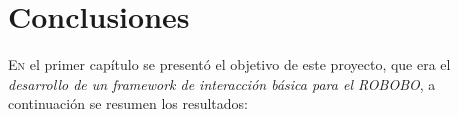 \chapter{Conclusiones}
\label{chap:conclusiones}
\vspace{0.5cm}



\lettrine{E}{n} el primer capítulo se presentó el objetivo de este proyecto, que era el \textit{desarrollo de un framework de interacción básica para el ROBOBO}, a continuación se resumen los resultados:

